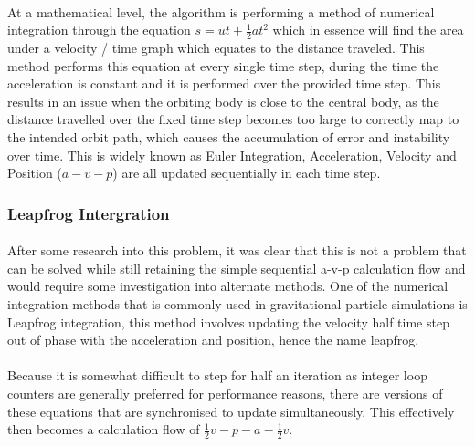 \paragraph{}
At a mathematical level, the algorithm is performing a method of numerical integration through the equation $s=ut+\frac{1}{2}at^2$ which in essence will find the area under a velocity / time graph which equates to the distance traveled. This method performs this equation at every single time step, during the time the acceleration is constant and it is performed over the provided time step. This results in an issue when the orbiting body is close to the central body, as the distance travelled over the fixed time step becomes too large to correctly map to the intended orbit path, which causes the accumulation of error and instability over time. This is widely known as Euler Integration, Acceleration, Velocity and Position ($a-v-p$) are all updated sequentially in each time step.

\subsubsection{Leapfrog Intergration}
\paragraph{}
After some research into this problem, it was clear that this is not a problem that can be solved while still retaining the simple sequential a-v-p calculation flow and would require some investigation into alternate methods. One of the numerical integration methods that is commonly used in gravitational particle simulations is Leapfrog integration, this method involves updating the velocity half time step out of phase with the acceleration and position, hence the name leapfrog.

\paragraph{}
Because it is somewhat difficult to step for half an iteration as integer loop counters are generally preferred for performance reasons, there are versions of these equations that are synchronised to update simultaneously. This effectively then becomes a calculation flow of $\frac{1}{2}v-p-a-\frac{1}{2}v$.